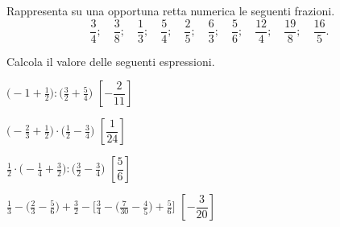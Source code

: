 \begin{comment}
\begin{esercizio}
\label{ese:3.137}
Relativamente alla figura~\ref{fig:3.6}, quale proposizione è vera?

\begin{enumeratea}
\item Il segmento~$AB$ la divide in due parti uguali;
\item il segmento~$AB$ la divide in due quadrilateri.
\end{enumeratea}
\end{esercizio}

 \begin{esercizio}
 \label{ese:3.138}
La parte in grigio rappresenta~$1/4$ della figura~\ref{fig:3.7}?
\end{esercizio}

\begin{esercizio}
\label{ese:3.139}
 Costruisci una figura che sia gli~$11/6$ della figura~\ref{fig:3.8}.
\end{esercizio}

\begin{esercizio}
\label{ese:3.140}
Colora i~$3/4$ della figura~\ref{fig:3.9}.
\end{esercizio}

\begin{esercizio}
\label{ese:3.141}
Costruire la frazione~$\frac{N}{D}$ significa dividere l'unità in \ldots 
parti uguali e prendere \ldots parti.
\end{esercizio}

\end{comment}

\begin{esercizio}
\label{ese:3.142}
Rappresenta su una opportuna retta numerica le seguenti frazioni.
\[\frac{3}{4};\quad\frac{3}{8};\quad\frac{1}{3};\quad\frac{5}{4};\quad
\frac{2}{5};\quad\frac{6}{3};\quad\frac{5}{6};\quad%
\frac{12}{4};\quad\frac{19}{8};\quad\frac{16}{5}.\]
\end{esercizio}

\begin{esercizio}[\Ast]
\label{ese:3.143}
Calcola il valore delle seguenti espressioni.
\begin{enumeratea}
\spazielenx
\item $\displaystyle{\bigg(-1+\frac{1}{2}\bigg):\bigg(\frac{3}{2}+
\frac{5}{4}\bigg)}$
  \hfill \(\left[-\dfrac{2}{11} \right]\)
\item $\displaystyle{\bigg(-{\frac{2}{3}}+\frac{1}{2}\bigg)\cdot
\bigg(\frac{1}{2}-\frac{3}{4}\bigg)}$
  \hfill \(\left[\dfrac{1}{24} \right]\)
\item $\displaystyle{\frac{1}{2}\cdot\bigg(-{\frac{1}{4}}+\frac{3}{2}\bigg):
\bigg(\frac{3}{2}-\frac{3}{4}\bigg)}$
  \hfill \(\left[\dfrac{5}{6} \right]\)
\item $\displaystyle{\frac{1}{3}-\bigg(\frac{2}{3}-\frac{5}{6}\bigg)+
\frac{3}{2}-\bigg[\frac{3}{4}-\bigg(\frac{7}{30}%
-\frac{4}{5}\bigg)+\frac{5}{6}\bigg]}$
  \hfill \(\left[-\dfrac{3}{20} \right]\)
\end{enumeratea}
\end{esercizio}

